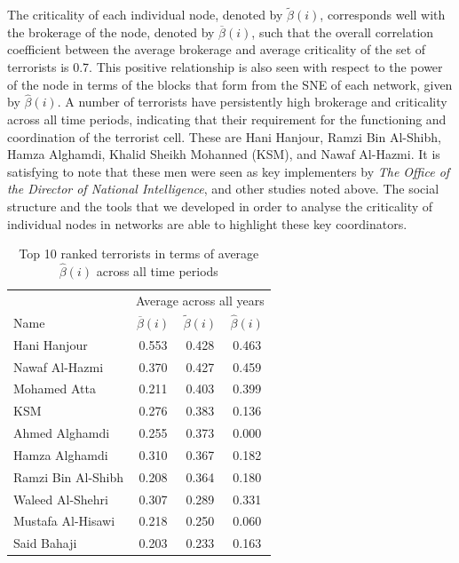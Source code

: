 The criticality of each individual node, denoted by $\tilde{\beta}(i)$, corresponds well with the brokerage of the node, denoted by $\overline{\beta}(i)$, such that the overall correlation coefficient between the average brokerage and average criticality of the set of terrorists is 0.7. This positive relationship is also seen with respect to the power of the node in terms of the blocks that form from the SNE of each network, given by $\hat{\beta}(i)$. A number of terrorists have persistently high brokerage and criticality across all time periods, indicating that their requirement for the functioning and coordination of the terrorist cell. These are Hani Hanjour, Ramzi Bin Al-Shibh, Hamza Alghamdi, Khalid Sheikh Mohanned (KSM), and Nawaf Al-Hazmi. It is satisfying to note that these men were seen as key implementers by \emph{The Office of the Director of National Intelligence}, and other studies noted above. The social structure and the tools that we developed in order to analyse the criticality of individual nodes in networks are able to highlight these key coordinators.

\begin{table}[t]
\begin{center}
\begin{tabular}{lccc}
\toprule
 & \multicolumn{3}{c}{Average across all years} \\[1ex]
Name & $\overline{\beta}(i)$ & $\widetilde{\beta}(i)$ & $\widehat{\beta}(i)$\\
\midrule
Hani Hanjour           &0.553	               &0.428	            &0.463	\\
Nawaf Al-Hazmi         &0.370	               &0.427	            &0.459	\\
Mohamed Atta           &0.211	               &0.403	            &0.399	\\
KSM                    &0.276	               &0.383	            &0.136	\\
Ahmed Alghamdi         &0.255	               &0.373	            &0.000	\\
Hamza Alghamdi         &0.310	               &0.367	            &0.182	\\
Ramzi Bin Al-Shibh     &0.208	               &0.364	            &0.180	\\
Waleed Al-Shehri       &0.307	               &0.289	            &0.331	\\
Mustafa Al-Hisawi      &0.218	               &0.250	            &0.060	\\
Said Bahaji            &0.203	               &0.233	            &0.163	\\
\bottomrule
\end{tabular}
\end{center}
\caption{Top 10 ranked terrorists in terms of average $\hat{\beta}(i)$ across all time periods}
\label{criticalterrorists}
\end{table}

